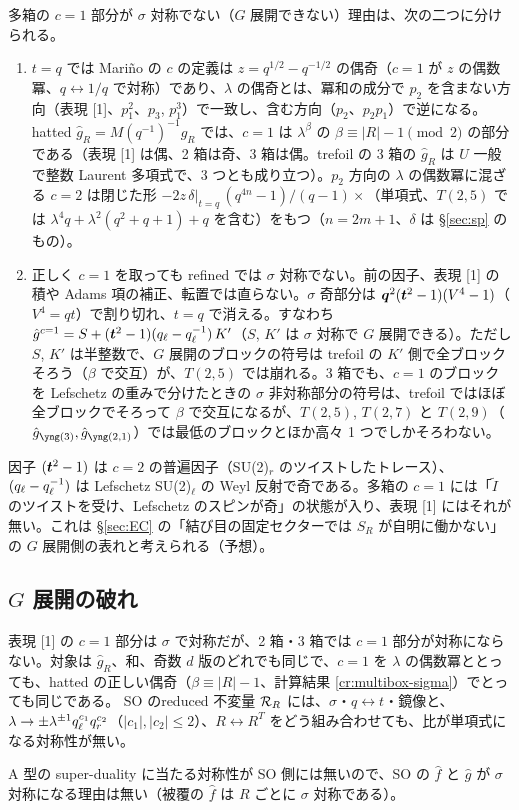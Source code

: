多箱の $c = 1$ 部分が $\sigma$ 対称でない（$G$ 展開できない）理由は、次の二つに分けられる。
\begin{compresult}\label{cr:multibox-sigma}
\begin{enumerate}
\item $t = q$ では Mariño の $c$ の定義は $z = q^{1/2} - q^{-1/2}$ の偶奇（$c = 1$ が $z$ の偶数冪、$q \leftrightarrow 1/q$ で対称）であり、$\lambda$ の偶奇とは、冪和の成分で $p_2$ を含まない方向（表現 [1]、$p_1^2$、$p_3$, $p_1^3$）で一致し、含む方向（$p_2$、$p_2 p_1$）で逆になる。hatted $\hat g_R = M(q^{-1})^{-1} g_R$ では、$c = 1$ は $\lambda^\beta$ の $\beta \equiv |R| - 1 \pmod 2$ の部分である（表現 [1] は偶、2 箱は奇、3 箱は偶。trefoil の 3 箱の $\hat g_R$ は $U$ 一般で整数 Laurent 多項式で、3 つとも成り立つ）。$p_2$ 方向の $\lambda$ の偶数冪に混ざる $c = 2$ は閉じた形 $-2 z\,\delta|_{t=q}\,(q^{4n}-1)/(q-1) \times$（単項式、$T(2,5)$ では $\lambda^4 q + \lambda^2(q^2+q+1) + q$ を含む）をもつ（$n = 2m+1$、$\delta$ は \S\ref{sec:sp} のもの）。
\item 正しく $c = 1$ を取っても refined では $\sigma$ 対称でない。前の因子、表現 [1] の積や Adams 項の補正、転置では直らない。$\sigma$ 奇部分は $\bm{q}^2(\bm{t}^2 - 1)(V^4 - 1)$（$V^4 = qt$）で割り切れ、$t = q$ で消える。すなわち $\hat g^{c=1} = S + (\bm{t}^2-1)(q_\ell - q_\ell^{-1})\,K'$（$S$, $K'$ は $\sigma$ 対称で $G$ 展開できる）。ただし $S$, $K'$ は半整数で、$G$ 展開のブロックの符号は trefoil の $K'$ 側で全ブロックそろう（$\beta$ で交互）が、$T(2,5)$ では崩れる。3 箱でも、$c = 1$ のブロックを Lefschetz の重みで分けたときの $\sigma$ 非対称部分の符号は、trefoil ではほぼ全ブロックでそろって $\beta$ で交互になるが、$T(2,5)$, $T(2,7)$ と $T(2,9)$（$\hat g_{\ythree}, \hat g_{\ytwoone}$）では最低のブロックとほか高々 1 つでしかそろわない。
\end{enumerate}
\end{compresult}
因子 $(\bm{t}^2 - 1)$ は $c = 2$ の普遍因子（SU(2)$_r$ のツイストしたトレース）、$(q_\ell - q_\ell^{-1})$ は Lefschetz SU(2)$_\ell$ の Weyl 反射で奇である。多箱の $c = 1$ には「$\tilde I$ のツイストを受け、Lefschetz のスピンが奇」の状態が入り、表現 [1] にはそれが無い。これは \S\ref{sec:EC} の「結び目の固定セクターでは $S_R$ が自明に働かない」の $G$ 展開側の表れと考えられる（予想）。

\subsection{$G$ 展開の破れ}
\begin{compresult}
表現 [1] の $c = 1$ 部分は $\sigma$ で対称だが、2 箱・3 箱では $c = 1$ 部分が対称にならない。対象は $\hat g_R$、和、奇数 $d$ 版のどれでも同じで、$c = 1$ を $\lambda$ の偶数冪ととっても、hatted の正しい偶奇（$\beta \equiv |R| - 1$、計算結果 \ref{cr:multibox-sigma}）でとっても同じである。
SO のreduced 不変量 $\mathcal{R}_R$ には、$\sigma$・$q\leftrightarrow t$・鏡像と、$\lambda \to \pm\lambda^{\pm1}q_\ell^{c_1}q_r^{c_2}$（$|c_1|, |c_2| \le 2$）、$R \leftrightarrow R^T$ をどう組み合わせても、比が単項式になる対称性が無い。
\end{compresult}
A 型の super-duality に当たる対称性が SO 側には無いので、SO の $\hat f$ と $\hat g$ が $\sigma$ 対称になる理由は無い（被覆の $\hat f$ は $R$ ごとに $\sigma$ 対称である）。

